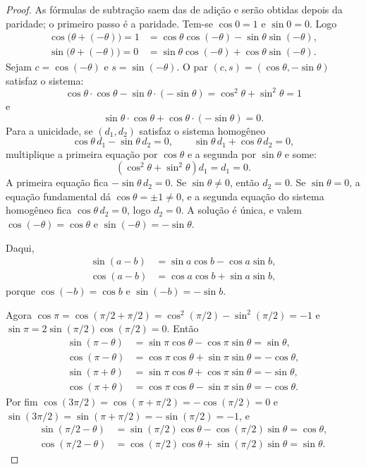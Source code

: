 \documentclass[11pt,a4paper]{article}
\begin{document}
\begin{proof}
As fórmulas de subtração saem das de adição e serão obtidas depois da paridade; o primeiro passo é a paridade. Tem-se $\cos 0=1$ e $\sin 0=0$. Logo
\begin{align*}
\cos\bigl(\theta+(-\theta)\bigr)=1
&=\cos\theta\cos(-\theta)-\sin\theta\sin(-\theta),\\
\sin\bigl(\theta+(-\theta)\bigr)=0
&=\sin\theta\cos(-\theta)+\cos\theta\sin(-\theta).
\end{align*}
Sejam $c=\cos(-\theta)$ e $s=\sin(-\theta)$. O par $(c,s)=(\cos\theta,-\sin\theta)$ satisfaz o sistema: 
\[
\cos\theta\cdot\cos\theta-\sin\theta\cdot(-\sin\theta)=\cos^2\theta+\sin^2\theta=1
\]
e
\[
\sin\theta\cdot\cos\theta+\cos\theta\cdot(-\sin\theta)=0.
\]
Para a unicidade, se $(d_1,d_2)$ satisfaz o sistema homogêneo
\[
\cos\theta\, d_1-\sin\theta\, d_2=0,\qquad \sin\theta\, d_1+\cos\theta\, d_2=0,
\]
multiplique a primeira equação por $\cos\theta$ e a segunda por $\sin\theta$ e some:
\[
(\cos^2\theta+\sin^2\theta)d_1=d_1=0.
\]
A primeira equação fica $-\sin\theta\, d_2=0$. Se $\sin\theta\neq 0$, então $d_2=0$. Se $\sin\theta=0$, a equação fundamental dá $\cos\theta=\pm 1\neq 0$, e a segunda equação do sistema homogêneo fica $\cos\theta\, d_2=0$, logo $d_2=0$. A solução é única, e valem $\cos(-\theta)=\cos\theta$ e $\sin(-\theta)=-\sin\theta$.

Daqui,
\begin{align*}
\sin(a-b)&=\sin a\cos b-\cos a\sin b,\\
\cos(a-b)&=\cos a\cos b+\sin a\sin b,
\end{align*}
porque $\cos(-b)=\cos b$ e $\sin(-b)=-\sin b$.

Agora $\cos\pi=\cos(\pi/2+\pi/2)=\cos^2(\pi/2)-\sin^2(\pi/2)=-1$ e $\sin\pi=2\sin(\pi/2)\cos(\pi/2)=0$. Então
\begin{align*}
\sin(\pi-\theta)&=\sin\pi\cos\theta-\cos\pi\sin\theta=\sin\theta,\\
\cos(\pi-\theta)&=\cos\pi\cos\theta+\sin\pi\sin\theta=-\cos\theta,\\
\sin(\pi+\theta)&=\sin\pi\cos\theta+\cos\pi\sin\theta=-\sin\theta,\\
\cos(\pi+\theta)&=\cos\pi\cos\theta-\sin\pi\sin\theta=-\cos\theta.
\end{align*}
Por fim $\cos(3\pi/2)=\cos(\pi+\pi/2)=-\cos(\pi/2)=0$ e $\sin(3\pi/2)=\sin(\pi+\pi/2)=-\sin(\pi/2)=-1$, e
\begin{align*}
\sin(\pi/2-\theta)&=\sin(\pi/2)\cos\theta-\cos(\pi/2)\sin\theta=\cos\theta,\\
\cos(\pi/2-\theta)&=\cos(\pi/2)\cos\theta+\sin(\pi/2)\sin\theta=\sin\theta.
\end{align*}
\end{proof}
\end{document}
